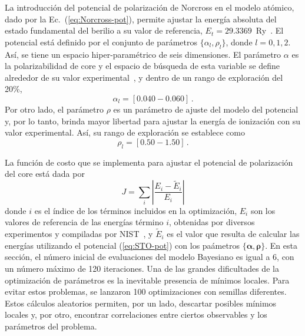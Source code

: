 La introducción del potencial de polarización de Norcross en el modelo 
atómico, dado por la Ec.~(\ref{eq:Norcross-pot}), permite ajustar la 
energía absoluta del estado fundamental del berilio a su valor de 
referencia, \mbox{$E_t=29.3369$ Ry}~\cite{NIST}. El potencial está 
definido por el conjunto de parámetros $\{\alpha_l,\rho_l\}$, donde 
$l=0,1,2$. Así, se tiene un espacio hiper-paramétrico de seis 
dimensiones. El parámetro $\alpha$ es la polarizabilidad de core y el 
espacio de búsqueda de esta variable se define alrededor de su valor 
experimental~\cite{Dalgarno:62,Sitz:71}, y dentro de un rango de 
exploración del 20\%,
\begin{equation}
\alpha_l=[0.040-0.060]\,.
\end{equation}
Por otro lado, el parámetro $\rho$ es un parámetro de ajuste del modelo 
del potencial y, por lo tanto, brinda mayor libertad para ajustar la 
energía de ionización con su valor experimental. Así, su rango de 
exploración se establece como
\begin{equation}
\rho_l=[0.50-1.50]\,.
\end{equation}

La función de costo que se implementa para ajustar el potencial de 
polarización del core está dada por 
\begin{equation}
J=\sum_{i} \left|\frac{E_{i}-\tilde{E}_{i}}{E_{i}} \right|
\label{eq:Jpol}
\end{equation}
donde $i$ es el índice de los términos incluidos en la optimización, 
$E_{i}$ son los valores de referencia de las energías término $i$, 
obtenidas por diversos experimentos y compiladas por NIST~\cite{NIST}, y 
$\tilde{E}_{i}$ es el valor que resulta de calcular las energías 
utilizando el potencial (\ref{eq:STO-pot}) con los paámetros 
$\{\boldsymbol\alpha,\boldsymbol\rho\}$.
En esta sección, el número inicial de evaluaciones del modelo Bayesiano 
es igual a 6, con un número máximo de 120 iteraciones. Una de las 
grandes dificultades de la optimización de parámetros es la inevitable 
presencia de mínimos locales. Para evitar estos problemas, se lanzaron 
100 optimizaciones con semillas diferentes. Estos cálculos aleatorios
permiten, por un lado, descartar posibles mínimos locales y, por otro, 
encontrar correlaciones entre ciertos observables y los parámetros del 
problema. 

